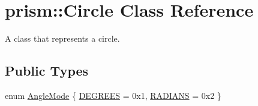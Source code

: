 \hypertarget{classprism_1_1_circle}{}\section{prism\+:\+:Circle Class Reference}
\label{classprism_1_1_circle}


A class that represents a circle.  


\subsection*{Public Types}
\begin{DoxyCompactItemize}
\item 
enum \hyperlink{classprism_1_1_circle_a74c7c532b4eb120b9227b7fabeffe6ac}{Angle\+Mode} \{ \hyperlink{classprism_1_1_circle_a74c7c532b4eb120b9227b7fabeffe6aca38d734252b9b86d558359698434cf5d4}{D\+E\+G\+R\+E\+ES} = 0x1, 
\hyperlink{classprism_1_1_circle_a74c7c532b4eb120b9227b7fabeffe6aca4e738ac91c0d446d1cd6c0ee11a7baaf}{R\+A\+D\+I\+A\+NS} = 0x2
 \}
\end{DoxyCompactItemize}
